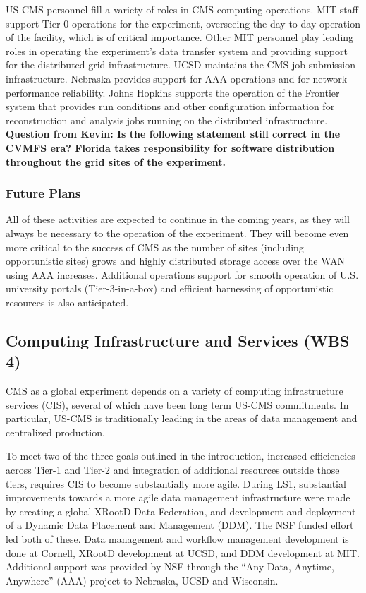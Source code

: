 \documentclass[11pt,a4paper]{article}
\begin{document}
US-CMS personnel fill a variety of roles in CMS computing operations.
MIT staff support Tier-0 operations for the experiment, overseeing the
day-to-day operation of the facility, which is of critical importance.  Other 
MIT personnel play leading roles in
operating the experiment's data transfer system and providing support for
the distributed grid infrastructure.  UCSD maintains the CMS job submission
infrastructure.  Nebraska provides support for AAA operations and for
network performance reliability.  Johns Hopkins supports the operation of
the Frontier system that provides run conditions and other configuration
information for reconstruction and analysis jobs running on the distributed
infrastructure.  {\bf Question from Kevin:  Is the following statement still correct in the CVMFS era?  Florida takes responsibility for software distribution
throughout the grid sites of the experiment.}

\subsubsection{Future Plans}

All of these activities are expected to continue in the coming years, as
they will always be necessary to the operation of the experiment.  They
will become even more critical to the success of CMS as the number of sites
(including opportunistic sites) grows and highly distributed storage access
over the WAN using AAA increases.  Additional operations support for smooth
operation of U.S. university portals (Tier-3-in-a-box) and efficient
harnessing of opportunistic resources is also anticipated.

\subsection{Computing Infrastructure and Services (WBS 4)}

CMS as a global experiment depends on a variety of computing infrastructure services (CIS), several of which
have been long term US-CMS commitments. In particular, US-CMS is traditionally leading in the areas
of data management and centralized production. 

To meet two of the three goals outlined in the introduction, increased efficiencies across Tier-1 and Tier-2
and integration of additional resources outside those tiers, requires CIS to become substantially more agile.
During LS1, substantial improvements towards a more agile data management infrastructure 
were made by creating a global XRootD Data Federation, and 
development and deployment of a Dynamic Data Placement and Management (DDM). 
The NSF funded effort led both of these. Data management and workflow 
management development is done at Cornell, XRootD development at
UCSD, and DDM development at MIT.  Additional 
support was provided by NSF through the ``Any Data, Anytime, Anywhere'' (AAA) project to Nebraska, UCSD
and Wisconsin.
\end{document}
